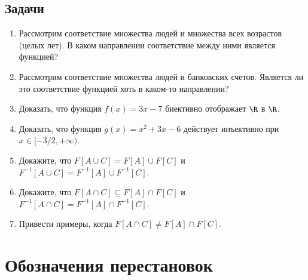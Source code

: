 \subsection*{Задачи}
\begin{enumerate}
\item Рассмотрим соответствие множества людей и множества всех возрастов (целых лет). В каком направлении соответствие между ними является функцией?
\item Рассмотрим соответствие множества людей и банковских счетов. Является ли это соответствие функцией хоть в каком-то направлении?
\item Доказать, что функция $f(x)=3x-7$ биективно отображает $\R$ в $\R$.
\item Доказать, что функция $g(x)=x^2+3x-6$ действует инъективно при $x\in[-3/2,+\infty)$.
\item Докажите, что $F[A\cup C]=F[A]\cup F[C]$ и $F^{-1}[A\cup C]=F^{-1}[A]\cup F^{-1}[C]$.
\item Докажите, что $F[A\cap C]\subseteq F[A]\cap F[C]$ и $F^{-1}[A\cap C]=F^{-1}[A]\cap F^{-1}[C]$.
\item Привести примеры, когда $F[A\cap C]\ne F[A]\cap F[C]$.
\end{enumerate}



\section{Обозначения перестановок}


